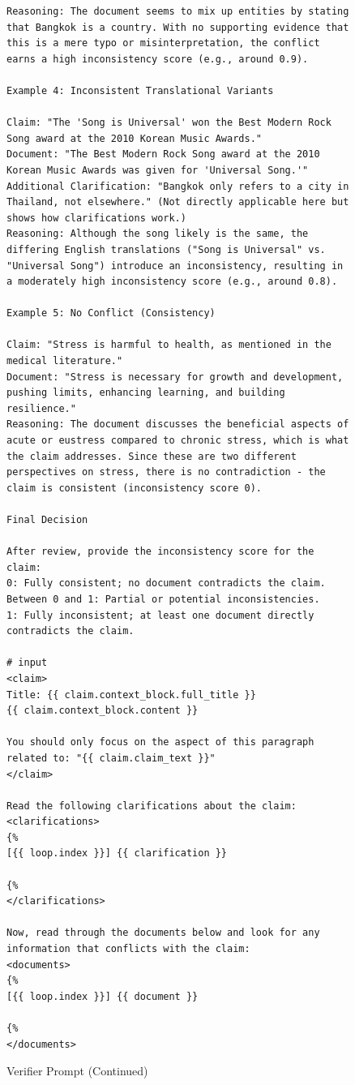 \documentclass[11pt]{article}
\begin{document}
\begin{figure}[htb]
\begin{lstlisting}
Reasoning: The document seems to mix up entities by stating that Bangkok is a country. With no supporting evidence that this is a mere typo or misinterpretation, the conflict earns a high inconsistency score (e.g., around 0.9).

Example 4: Inconsistent Translational Variants

Claim: "The 'Song is Universal' won the Best Modern Rock Song award at the 2010 Korean Music Awards."
Document: "The Best Modern Rock Song award at the 2010 Korean Music Awards was given for 'Universal Song.'"
Additional Clarification: "Bangkok only refers to a city in Thailand, not elsewhere." (Not directly applicable here but shows how clarifications work.)
Reasoning: Although the song likely is the same, the differing English translations ("Song is Universal" vs. "Universal Song") introduce an inconsistency, resulting in a moderately high inconsistency score (e.g., around 0.8).

Example 5: No Conflict (Consistency)

Claim: "Stress is harmful to health, as mentioned in the medical literature."
Document: "Stress is necessary for growth and development, pushing limits, enhancing learning, and building resilience."
Reasoning: The document discusses the beneficial aspects of acute or eustress compared to chronic stress, which is what the claim addresses. Since these are two different perspectives on stress, there is no contradiction - the claim is consistent (inconsistency score 0).

Final Decision

After review, provide the inconsistency score for the claim:
0: Fully consistent; no document contradicts the claim.
Between 0 and 1: Partial or potential inconsistencies.
1: Fully inconsistent; at least one document directly contradicts the claim.

# input
<claim>
Title: {{ claim.context_block.full_title }}
{{ claim.context_block.content }}

You should only focus on the aspect of this paragraph related to: "{{ claim.claim_text }}"
</claim>

Read the following clarifications about the claim:
<clarifications>
{%
[{{ loop.index }}] {{ clarification }}

{%
</clarifications>

Now, read through the documents below and look for any information that conflicts with the claim:
<documents>
{%
[{{ loop.index }}] {{ document }}

{%
</documents>
\end{lstlisting}

\caption{Verifier Prompt (Continued)} \label{lst:verifier_2}
\end{figure}
\end{document}
